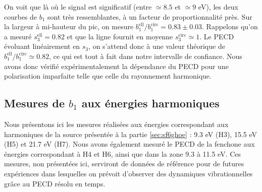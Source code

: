 On voit que là où le signal est significatif (entre $\simeq8.5$ et $\simeq 9$ eV), les deux courbes de $b_1$ sont très ressemblantes, à un facteur de proportionnalité près. Sur la largeur à mi-hauteur du pic, on mesure $b_1^{\text{ell}}/b_1^{\text{circ}} = 0.83 \pm 0.03$. Rappelons qu'on a mesuré $s_3^{\text{ell}} = 0.82$ et que la ligne fournit en moyenne $s_3^{\text{circ}} \simeq 1$. Le PECD évoluant linéairement en $s_3$, on s'attend donc à une valeur théorique de $b_1^{\text{ell}}/b_1^{\text{circ}} \simeq 0.82$, ce qui est tout à fait dans notre intervalle de confiance. Nous avons donc vérifié expérimentalement la dépendance du PECD pour une polarisation imparfaite telle que celle du rayonnement harmonique.

\subsection{Mesures de $b_1$ aux énergies harmoniques}
Nous présentons ici les mesures réalisées aux énergies correspondant aux harmoniques de la source présentée à la partie \ref{sec:sf6ghoe} : 9.3 eV (H3), 15.5 eV (H5) et 21.7 eV (H7). Nous avons également mesuré le PECD de la fenchone aux énergies correspondant à H4 et H6, ainsi que dans la zone 9.3 à 11.5 eV. Ces mesures, non présentées ici, serviront de données de référence pour de futures expériences dans lesquelles on prévoit d'observer des dynamiques vibrationnelles grâce au PECD résolu en temps.

